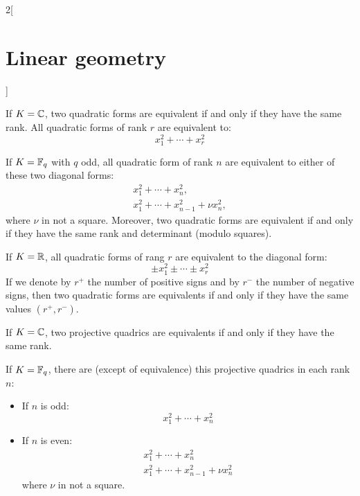 \documentclass[../../../main_math.tex]{subfiles}
\begin{document}
\begin{multicols}{2}[\section{Linear geometry}]
\begin{proposition}
  \end{proposition}
  \begin{theorem}
    If $K=\mathbb{C} $, two quadratic forms are equivalent if and only if they have the same rank. All quadratic forms of rank $r$ are equivalent to: $$x_1^2+\cdots+x_r^2$$
  \end{theorem}
  \begin{theorem}
    If $K=\mathbb{F}_q$ with $q$ odd, all quadratic form
    of rank $n$ are equivalent to either of these two diagonal forms:
    \begin{gather*}
      x_1^2+\cdots+ x_n^2,\\
      x_1^2+\cdots+ x_{n-1}^2+\nu x_n^2,
    \end{gather*}
    where $\nu$ in not a square. Moreover, two quadratic forms are equivalent if and only if they have the same rank and determinant (modulo squares).
  \end{theorem}
  \begin{theorem}
    If $K=\mathbb{R} $, all quadratic forms
    of rang $r$ are equivalent to the diagonal form:
    $$\pm x_1^2\pm\cdots\pm x_r^2$$ If we denote by $r^+$ the number of positive signs and by $r^-$ the number of negative signs, then two quadratic forms are equivalents if and only if they have the same values $(r^+,r^-)$.
  \end{theorem}
  \begin{theorem}
    If $K=\mathbb{C} $, two projective quadrics are equivalents if and only if they have the same rank.
  \end{theorem}
  \begin{theorem}
    If $K=\mathbb{F}_q$, there are (except of equivalence) this projective quadrics in each rank $n$:
    \begin{itemize}
      \item If $n$ is odd: $$\displaystyle x_1^2+\cdots+ x_n^2$$
      \item If $n$ is even: \begin{gather*}
              x_1^2+\cdots+ x_n^2\\
              x_1^2+\cdots+ x_{n-1}^2+\nu x_n^2
            \end{gather*}
            where $\nu$ in not a square.
    \end{itemize}
  \end{theorem}

\end{multicols}
\end{document}

